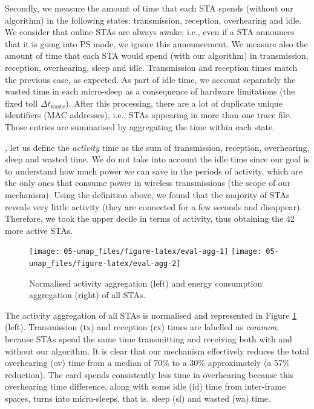 \documentclass[twoside,nohyper]{tufte-book}
\begin{document}
Secondly, we measure the amount of time that each STA spends (without our algorithm) in the following states: transmission, reception, overhearing and idle. We consider that online STAs are always awake; i.e., even if a STA announces that it is going into PS mode, we ignore this announcement. We measure also the amount of time that each STA would spend (with our algorithm) in transmission, reception, overhearing, sleep and idle. Transmission and reception times match the previous case, as expected. As part of idle time, we account separately the wasted time in each micro-sleep as a consequence of hardware limitations (the fixed toll \(\Delta t_\mathrm{waste}\)). After this processing, there are a lot of duplicate unique identifiers (MAC addresses), i.e., STAs appearing in more than one trace file. Those entries are summarised by aggregating the time within each state.

, let us define the \emph{activity} time as the sum of transmission, reception, overhearing, sleep and wasted time. We do not take into account the idle time since our goal is to understand how much power we can save in the periods of activity, which are the only ones that consume power in wireless transmissions (the scope of our mechanism). Using the definition above, we found that the majority of STAs reveals very little activity (they are connected for a few seconds and disappear). Therefore, we took the upper decile in terms of activity, thus obtaining the 42 more active STAs.



\begin{figure}

{\centering \texttt{[image: 05-unap\_files/figure-latex/eval-agg-1]} \texttt{[image: 05-unap\_files/figure-latex/eval-agg-2]} 

}

\caption[Normalised activity aggregation (left) and energy consumption aggregation (right) of all STAs.]{Normalised activity aggregation (left) and energy consumption aggregation (right) of all STAs.}\label{fig:eval-agg}
\end{figure}

The activity aggregation of all STAs is normalised and represented in Figure \ref{fig:eval-agg} (left). Transmission (tx) and reception (rx) times are labelled as \emph{common}, because STAs spend the same time transmitting and receiving both with and without our algorithm. It is clear that our mechanism effectively reduces the total overhearing (ov) time from a median of 70\% to a 30\% approximately (a 57\% reduction). The card spends consistently less time in overhearing because this overhearing time difference, along with some idle (id) time from inter-frame spaces, turns into micro-sleeps, that is, sleep (sl) and wasted (wa) time.
\end{document}
